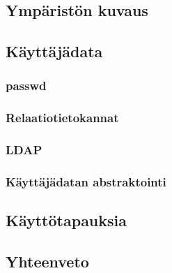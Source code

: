
\subsection{Ympäristön kuvaus}

\subsection{Käyttäjädata}

\subsubsection{passwd}

\subsubsection{Relaatiotietokannat}

\subsubsection{LDAP}

\subsubsection{Käyttäjädatan abstraktointi}

\subsection{Käyttötapauksia}

\subsection{Yhteenveto}

